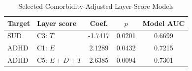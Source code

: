 \begin{table}[!t]
\caption{Selected Comorbidity-Adjusted Layer-Score Models}
\label{tab:adjusted}
\centering
\footnotesize
\begin{tabular}{llccc}
\hline
Target & Layer score & Coef. & $p$ & Model AUC \\
\hline
SUD & C3: $T$ & -1.7417 & 0.0201 & 0.6699 \\
ADHD & C1: $E$ & 2.1289 & 0.0432 & 0.7215 \\
ADHD & C5: $E+D+T$ & 2.6385 & 0.0094 & 0.7301 \\
\hline
\end{tabular}
\end{table}
